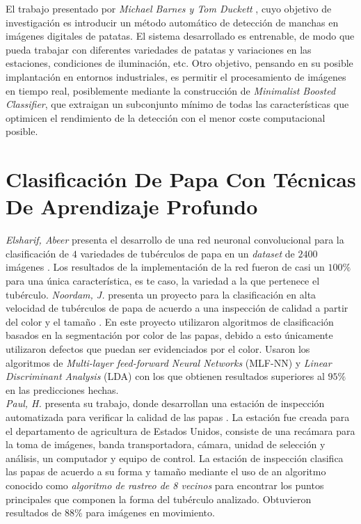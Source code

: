 El trabajo presentado por \textit{Michael Barnes y Tom Duckett} \cite{Barnes2010}, cuyo objetivo de  investigación es introducir un método automático de detección de manchas en imágenes digitales de patatas. El sistema desarrollado es entrenable, de modo que pueda trabajar con diferentes variedades de patatas y variaciones en las estaciones, condiciones de iluminación, etc. Otro objetivo, pensando en su posible implantación en entornos industriales, es permitir el procesamiento de imágenes en tiempo real, posiblemente mediante la construcción de \textit{Minimalist Boosted Classifier}, que extraigan un subconjunto mínimo de todas las características que optimicen el rendimiento de la detección con el menor coste computacional posible.


\section{Clasificación De Papa Con Técnicas De Aprendizaje Profundo}

\textit{Elsharif, Abeer} presenta el desarrollo de una red neuronal convolucional  para la clasificación de $4$ variedades de tubérculos de papa en un \textit{dataset} de $2400$ imágenes \cite{elsharif2020potato}. Los resultados de la implementación de la red fueron de casi un $100\%$ para una única característica, es te caso, la variedad a la que pertenece el tubérculo. \textit{Noordam, J.} presenta un proyecto para la clasificación en alta velocidad de tubérculos de papa de acuerdo a una inspección de calidad a partir del color y el tamaño \cite{noordam2000high}. En este proyecto utilizaron algoritmos de clasificación basados en la segmentación por color de las papas, debido a esto únicamente utilizaron defectos que puedan ser evidenciados por el color. Usaron los algoritmos de \textit{Multi-layer feed-forward Neural Networks} (MLF-NN) y \textit{Linear Discriminant Analysis} (LDA) con los que obtienen resultados superiores al $95\%$ en las predicciones hechas.\\

\textit{Paul, H.} presenta su trabajo, donde desarrollan una estación de inspección automatizada para verificar la calidad de las papas \cite{heinemann1996automated}. La estación fue creada para el departamento de agricultura de Estados Unidos, consiste de una recámara para la toma de imágenes, banda transportadora, cámara, unidad de selección y análisis, un computador y equipo de control. La estación de inspección clasifica las papas de acuerdo a su forma y tamaño mediante el uso de an algoritmo conocido como \textit{algoritmo de rastreo de 8 vecinos} para encontrar los puntos principales que componen la forma del tubérculo analizado. Obtuvieron resultados de $88\%$ para imágenes en movimiento.









